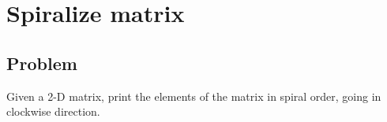 
\section{Spiralize matrix}



\subsection*{Problem}

Given a 2-D matrix, print the elements of the matrix in spiral order,
going in clockwise direction.
